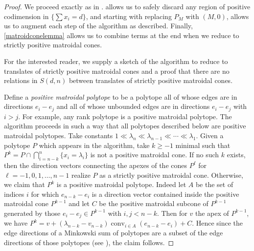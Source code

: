 \documentclass[12pt]{amsart}
\newcommand{\conv}{{\operatorname{conv}}}
\theoremstyle{plain}
\theoremstyle{definition}
\theoremstyle{remark}
\begin{document}
\begin{proof}
We proceed exactly as in .  allows us to safely discard any region of positive codimension in $\{\sum x_i=d\}$, and  starting with replacing $P_M$ with $(M,0)$,  allows us to augment each step of the algorithm as described. Finally, \cref{matroidconelemma} allows us to combine terms at the end when we reduce to strictly positive matroidal cones.

For the interested reader, we supply a sketch of the algorithm to reduce to translates of strictly positive matroidal cones and a proof that there are no relations in $S(d,n)$ between translates of strictly positive matroidal cones.

Define a \emph{positive matroidal polytope} to be a polytope all of whose edges are in directions $e_i - e_j$ and all of whose unbounded edges are in directions $e_i - e_j$ with $i > j$. For example, any rank polytope is a positive matroidal polytope. The algorithm proceeds in such a way that all polytopes described below are positive matroidal polytopes. Take constants $1 \ll \lambda_n \ll \lambda_{n-1} \ll \cdots \ll \lambda_1$. Given a polytope $P$ which appears in the algorithm, take $k \ge -1$ minimal such that $P^k=P\cap \bigcap_{i=n-k}^n \{x_i=\lambda_i\}$ is not a positive matroidal cone. If no such $k$ exists, then the direction vectors connecting the apexes of the cones $P^\ell$ for $\ell=-1,0,1,\ldots,n-1$ realize $P$ as a strictly positive matroidal cone. Otherwise, we claim that $P^k$ is a positive matroidal polytope. Indeed let $A$ be the set of indices $i$ for which $e_{n-k}-e_i$ is a direction vector contained inside the positive matroidal cone $P^{k-1}$ and let $C$ be the positive matroidal subcone of $P^{k-1}$ generated by those $e_i-e_j\in P^{k-1}$ with $i,j < n-k$. Then for $v$ the apex of $P^{k-1}$, we have $P^k=v+(\lambda_{n-k}-v_{n-k})\conv_{i \in A}(e_{n-k}-e_i)+C$. Hence since the edge directions of a Minkowski sum of polytopes are a subset of the edge directions of those polytopes (see ), the claim follows.


\end{proof}
\end{document}
